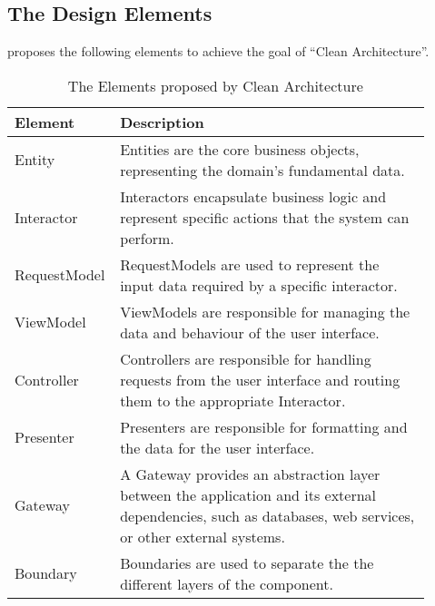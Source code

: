 \subsection{The Design Elements} \label{subsec_design_elements}

\textcite{robert_c_martin_clean_2018} proposes the following elements to achieve
the goal of \enquote{Clean Architecture}.

\begin{table}[H]
    \begin{tabular}{ p{0.17\linewidth} p{0.74\linewidth}}
        \hline
        \textbf{Element} & \textbf{Description} \\ 
        \hline
        Entity & Entities are the core business objects, representing the domain's
        fundamental data.\\ \midrule

        Interactor & Interactors encapsulate business logic and represent specific actions
        that the system can perform. \\ \midrule

        RequestModel & RequestModels are used to represent the input data required by a specific
        interactor.\\ \midrule

        ViewModel & ViewModels are responsible for managing the data and behaviour of the
        user interface. \\ \midrule

        Controller & Controllers are responsible for handling requests from the user
        interface and routing them to the appropriate Interactor.\\ \midrule

        Presenter & Presenters are responsible for formatting and the data for the user
        interface.\\ \midrule

        Gateway & A Gateway provides an abstraction layer between the application and its
        external dependencies, such as databases, web services, or other external
        systems.\\ \midrule

        Boundary & Boundaries are used to separate the the different layers of the component.\\

        \bottomrule
    \end{tabular}
    \caption{The Elements proposed by Clean Architecture}
    \label{ca_element}
\end{table}